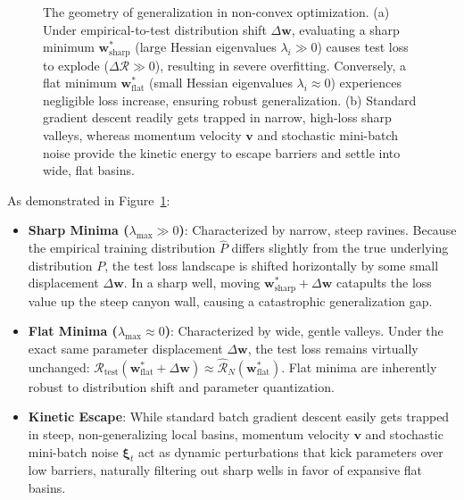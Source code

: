 \begin{figure}[htbp]
{%
}
\caption{The geometry of generalization in non-convex optimization. (a) Under empirical-to-test distribution shift $\Delta \mathbf{w}$, evaluating a sharp minimum $\mathbf{w}^*_{\mathrm{sharp}}$ (large Hessian eigenvalues $\lambda_i \gg 0$) causes test loss to explode ($\Delta \mathcal{R} \gg 0$), resulting in severe overfitting. Conversely, a flat minimum $\mathbf{w}^*_{\mathrm{flat}}$ (small Hessian eigenvalues $\lambda_i \approx 0$) experiences negligible loss increase, ensuring robust generalization. (b) Standard gradient descent readily gets trapped in narrow, high-loss sharp valleys, whereas momentum velocity $\mathbf{v}$ and stochastic mini-batch noise provide the kinetic energy to escape barriers and settle into wide, flat basins.}
\label{fig:flat_vs_sharp_minima}
\end{figure}

As demonstrated in Figure~\ref{fig:flat_vs_sharp_minima}:
\begin{itemize}
  \item \textbf{Sharp Minima ($\lambda_{\max} \gg 0$)}: Characterized by narrow, steep ravines. Because the empirical training distribution $\hat{P}$ differs slightly from the true underlying distribution $P$, the test loss landscape is shifted horizontally by some small displacement $\Delta \mathbf{w}$. In a sharp well, moving $\mathbf{w}^*_{\text{sharp}} + \Delta \mathbf{w}$ catapults the loss value up the steep canyon wall, causing a catastrophic generalization gap.
  \item \textbf{Flat Minima ($\lambda_{\max} \approx 0$)}: Characterized by wide, gentle valleys. Under the exact same parameter displacement $\Delta \mathbf{w}$, the test loss remains virtually unchanged: $\mathcal{R}_{\text{test}}(\mathbf{w}^*_{\text{flat}} + \Delta \mathbf{w}) \approx \hat{\mathcal{R}}_N(\mathbf{w}^*_{\text{flat}})$. Flat minima are inherently robust to distribution shift and parameter quantization.
  \item \textbf{Kinetic Escape}: While standard batch gradient descent easily gets trapped in steep, non-generalizing local basins, momentum velocity $\mathbf{v}$ and stochastic mini-batch noise $\boldsymbol{\xi}_t$ act as dynamic perturbations that kick parameters over low barriers, naturally filtering out sharp wells in favor of expansive flat basins.
\end{itemize}

